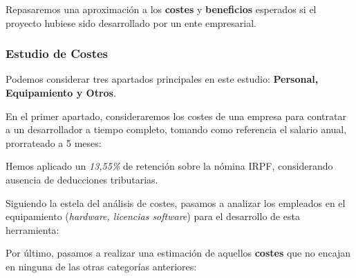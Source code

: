 Repasaremos una aproximación a los \textbf{costes} y \textbf{beneficios} esperados si el proyecto hubiese sido desarrollado por un ente empresarial.

\subsubsection{Estudio de Costes}

Podemos considerar tres apartados principales en este estudio:
\textbf{Personal, Equipamiento y Otros}. 

En el primer apartado, consideraremos los costes de una empresa para contratar a un desarrollador a tiempo completo, tomando como referencia el salario anual, prorrateado a 5 meses:


Hemos aplicado un \textit{13,55\%} de retención sobre la nómina IRPF, considerando ausencia de deducciones tributarias.

Siguiendo la estela del análisis de costes, pasamos a analizar los empleados en el equipamiento (\textit{hardware, licencias software}) para el desarrollo de esta herramienta:


Por último, pasamos a realizar una estimación de aquellos \textbf{costes} que no encajan en ninguna de las otras categorías anteriores:



